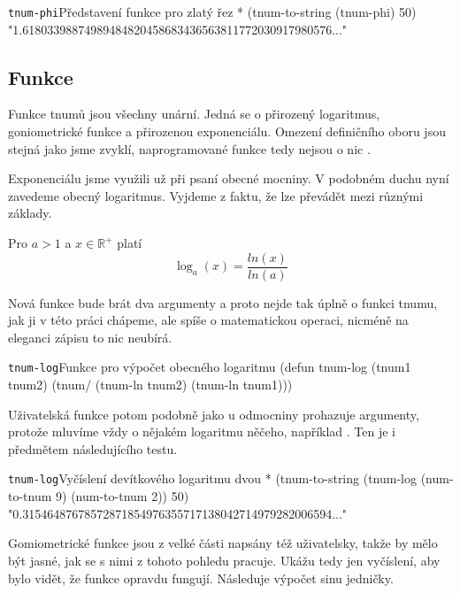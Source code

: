 \begin{lisptest}{\texttt{tnum-phi}}{Představení funkce pro zlatý řez}
* (tnum-to-string (tnum-phi) 50)
"1.61803398874989484820458683436563811772030917980576..."
\end{lisptest}

\subsection{Funkce}
Funkce tnumů jsou všechny unární. Jedná se o přirozený logaritmus, goniometrické funkce a přirozenou exponenciálu. Omezení definičního oboru jsou stejná jako jsme zvyklí, naprogramované funkce tedy nejsou o nic .

Exponenciálu jsme využili už při psaní obecné mocniny. V podobném duchu nyní zavedeme obecný logaritmus. Vyjdeme z faktu, že lze převádět mezi různými základy.

\begin{fact}
Pro $a>1$ a $x\in\mathbb{R}^+$ platí
\begin{equation}
\log_a(x)=\frac{ln(x)}{ln(a)}
\end{equation}
\end{fact}

Nová funkce bude brát dva argumenty a proto nejde tak úplně o funkci tnumu, jak ji v této práci chápeme, ale spíše o matematickou operaci, nicméně na eleganci zápisu to nic neubírá.

\begin{lispcode}{\texttt{tnum-log}}{Funkce pro výpočet obecného logaritmu}
(\textcolor{funkcionalni}{defun} \textcolor{pojmenovan}{tnum-log} (tnum1 tnum2)
  (\textcolor{moje}{tnum/} (\textcolor{moje}{tnum-ln} tnum2) (\textcolor{moje}{tnum-ln} tnum1)))
\end{lispcode}

Uživatelská funkce potom podobně jako u odmocniny prohazuje argumenty, protože mluvíme vždy o nějakém logaritmu něčeho, například . Ten je i předmětem následujícího testu.

\begin{lisptest}{\texttt{tnum-log}}{Vyčíslení devítkového logaritmu dvou}
* (tnum-to-string (tnum-log (num-to-tnum 9) (num-to-tnum 2)) 50)
"0.31546487678572871854976355717138042714979282006594..."
\end{lisptest}

Gomiometrické funkce jsou z velké části napsány též uživatelsky, takže by mělo být jasné, jak se s nimi z tohoto pohledu pracuje. Ukážu tedy jen vyčíslení, aby bylo vidět, že funkce opravdu fungují. Následuje výpočet sinu jedničky.


